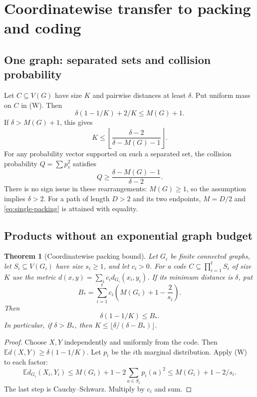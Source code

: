 \documentclass[11pt,a4paper]{article}
\newtheorem{theorem}{Theorem}[section]
\theoremstyle{definition}
\theoremstyle{remark}
\newcommand{\E}{\mathbb E}
\numberwithin{equation}{section}
\begin{document}
\section{Coordinatewise transfer to packing and coding}

\subsection{One graph: separated sets and collision probability}

Let $C\subseteq V(G)$ have size $K$ and pairwise distances at least
$\delta$. Put uniform mass on $C$ in (W). Then
\[
\delta(1-1/K)+2/K\le M(G)+1.
\]
If $\delta>M(G)+1$, this gives
\begin{equation}
K\le\left\lfloor\frac{\delta-2}{\delta-M(G)-1}\right\rfloor.
\label{eq:single-packing}
\end{equation}
For any probability vector supported on such a separated set, the
collision probability $Q=\sum p_v^2$ satisfies
\[
Q\ge\frac{\delta-M(G)-1}{\delta-2}.
\]
There is no sign issue in these rearrangements: $M(G)\ge1$, so the
assumption implies $\delta>2$.
For a path of length $D>2$ and its two endpoints, $M=D/2$ and
\eqref{eq:single-packing} is attained with equality.

\subsection{Products without an exponential graph budget}

\begin{theorem}[Coordinatewise packing bound]\label{thm:product-packing}
Let $G_i$ be finite connected graphs, let
$S_i\subseteq V(G_i)$ have size $s_i\ge1$, and let $c_i>0$.
For a code $C\subseteq\prod_{i=1}^t S_i$ of size $K$ use the metric
$d(x,y)=\sum_i c_i d_{G_i}(x_i,y_i)$.
If its minimum distance is $\delta$, put
\[
B_*=\sum_{i=1}^t c_i\left(M(G_i)+1-\frac2{s_i}\right).
\]
Then
\[
\delta(1-1/K)\le B_*.
\]
In particular, if $\delta>B_*$, then
$K\le\lfloor\delta/(\delta-B_*)\rfloor$.
\end{theorem}
\begin{proof}
Choose $X,Y$ independently and uniformly from the code.
Then $\E d(X,Y)\ge\delta(1-1/K)$.
Let $p_i$ be the $i$th marginal distribution. Apply (W) to each factor:
\[
\E d_{G_i}(X_i,Y_i)
\le M(G_i)+1-2\sum_{a\in S_i}p_i(a)^2
\le M(G_i)+1-2/s_i.
\]
The last step is Cauchy--Schwarz. Multiply by $c_i$ and sum.
\end{proof}
\end{document}
